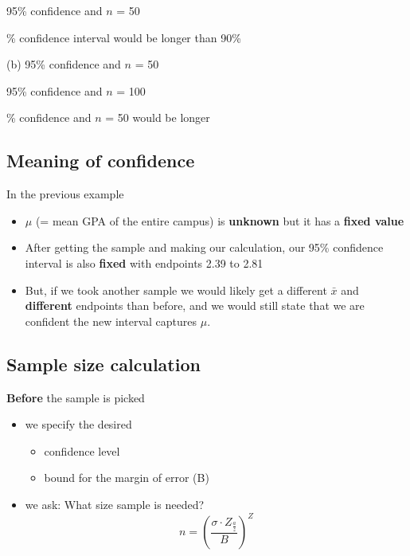 \documentclass{report}
\begin{document}
\hspace{-4mm}95\% confidence and $n$ = 50
\vspace{1.5mm}

\sol
\vspace{1mm}

\% confidence interval would be longer than 90\%

\bigbreak \noindent
(b) 95\% confidence and $n$ = 50
\vspace{1mm}

\hspace{-5mm} 95\% confidence and $n$ = 100
\vspace{1.5mm}

\sol
\vspace{1.5mm}

\% confidence and $n$ = 50 would be longer
\bigbreak \noindent
\subsection*{Meaning of confidence}
In the previous example
\begin{itemize}
  \item $\mu$ (= mean GPA of the entire campus) is \textbf{unknown} but it has a \textbf{fixed value}
  \item After getting the sample and making our calculation, our 95\% confidence interval is also \textbf{fixed} with endpoints 2.39 to 2.81
  \item But, if we took another sample we would likely get a different $\bar{x}$ and \textbf{different} endpoints than before, and we would still state that we are confident the new interval captures $\mu$.
\end{itemize}
\bigbreak \noindent
\subsection*{Sample size calculation}
\textbf{Before} the sample is picked
\begin{itemize}
  \item we specify the desired 
    \begin{itemize}[label=$\circ$]
      \item confidence level 
      \item bound for the margin of error (B)
    \end{itemize}
  \item we ask: What size sample is needed?
    $$ n = \left(\dfrac{\sigma \cdot Z_{\frac{a}{z}}}{B}\right)^Z$$
\end{itemize}
\end{document}
